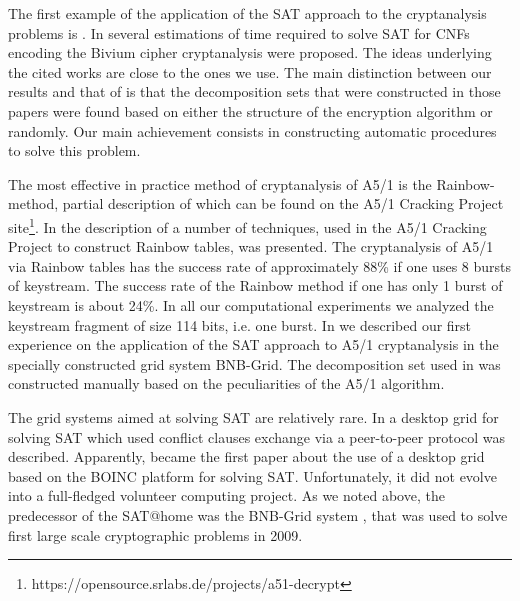 \documentclass[runningheads,a4paper]{llncs}
\begin{document}
The first example of the application of the SAT approach to the cryptanalysis problems is \cite{DBLP:journals/jar/MassacciM00}. In \cite{techrep/Mcdonald07,DBLP:conf/sat/EibachPV08,DBLP:conf/sat/SoosNC09,DBLP:conf/tools/Soos10} several estimations of time required to solve SAT for CNFs encoding the Bivium cipher cryptanalysis were proposed. The ideas underlying the cited works are close to the ones we use. The main distinction between our results and that of \cite{techrep/Mcdonald07,DBLP:conf/sat/EibachPV08,DBLP:conf/sat/SoosNC09,DBLP:conf/tools/Soos10} is that the decomposition sets that were constructed in those papers were found based on either the structure of the encryption algorithm or randomly. Our main achievement consists in constructing automatic procedures to solve this problem.

The most effective in practice method of cryptanalysis of A5/1 is the Rainbow-method, partial description of which can be found on the A5/1 Cracking Project site\footnote{https://opensource.srlabs.de/projects/a51-decrypt}. In \cite{Guneysu:2008:CC:1446228.1446266} the description of a number of techniques, used in the A5/1 Cracking Project to construct Rainbow tables, was presented. The cryptanalysis of A5/1 via Rainbow tables has the success rate of approximately 88\% if one uses 8 bursts of keystream. The success rate of the Rainbow method if one has only 1 burst of keystream is about 24\%. In all our computational experiments we analyzed the keystream fragment of size 114 bits, i.e. one burst. In \cite{DBLP:conf/pact/SemenovZBP11} we described our first experience on the application of the SAT approach to A5/1 cryptanalysis in the specially constructed grid system BNB-Grid. The decomposition set used in \cite{DBLP:conf/pact/SemenovZBP11} was constructed manually based on the peculiarities of the A5/1 algorithm.
 
The grid systems aimed at solving SAT are relatively rare. In \cite{DBLP:journals/grid/SchulzB10} a desktop grid for solving SAT which used conflict clauses exchange via a peer-to-peer protocol was described. Apparently, \cite{DBLP:conf/grid/BlackB11} became the first paper about the use of a desktop grid based on the BOINC platform for solving SAT. Unfortunately, it did not evolve into a full-fledged volunteer computing project. As we noted above, the predecessor of the SAT@home was the BNB-Grid system \cite{DBLP:journals/ife/EvtushenkoPS09,DBLP:conf/pact/SemenovZBP11}, that was used to solve first large scale cryptographic problems in 2009. 
\end{document}
